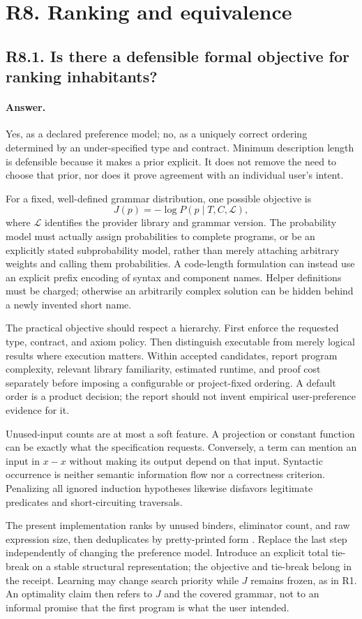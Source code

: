 \documentclass[11pt,a4paper]{article}
\newcommand{\answer}{\paragraph{Answer.}}
\theoremstyle{definition}
\theoremstyle{remark}
\begin{document}
\section{R8. Ranking and equivalence}
\label{sec:r8}

\subsection{R8.1. Is there a defensible formal objective for ranking inhabitants?}
\answer Yes, as a declared preference model; no, as a uniquely correct ordering
determined by an under-specified type and contract. Minimum description length
is defensible because it makes a prior explicit. It does not remove the need
to choose that prior, nor does it prove agreement with an individual user's
intent.

For a fixed, well-defined grammar distribution, one possible objective is
\[
 J(p)=-\log P(p\mid T,C,\mathcal L),
\]
where $\mathcal L$ identifies the provider library and grammar version. The
probability model must actually assign probabilities to complete programs, or
be an explicitly stated subprobability model, rather than merely attaching
arbitrary weights and calling them probabilities. A code-length formulation
can instead use an explicit prefix encoding of syntax and component names.
Helper definitions must be charged; otherwise an arbitrarily complex solution
can be hidden behind a newly invented short name.

The practical objective should respect a hierarchy. First enforce the requested
type, contract, and axiom policy. Then distinguish executable from merely
logical results where execution matters. Within accepted candidates, report
program complexity, relevant library familiarity, estimated runtime, and proof
cost separately before imposing a configurable or project-fixed ordering.
A default order is a product decision; the report should not invent empirical
user-preference evidence for it.

Unused-input counts are at most a soft feature. A projection or constant
function can be exactly what the specification requests. Conversely, a term
can mention an input in $x-x$ without making its output depend on that input.
Syntactic occurrence is neither semantic information flow nor a correctness
criterion. Penalizing all ignored induction hypotheses likewise disfavors
legitimate predicates and short-circuiting traversals.

The present implementation ranks by unused binders, eliminator count, and raw
expression size, then deduplicates by pretty-printed form \cite{repo}. Replace
the last step independently of changing the preference model. Introduce an
explicit total tie-break on a stable structural representation; the objective
and tie-break belong in the receipt. Learning may change search priority while
$J$ remains frozen, as in R1. An optimality claim then refers to $J$ and the
covered grammar, not to an informal promise that the first program is what the
user intended.
\end{document}
